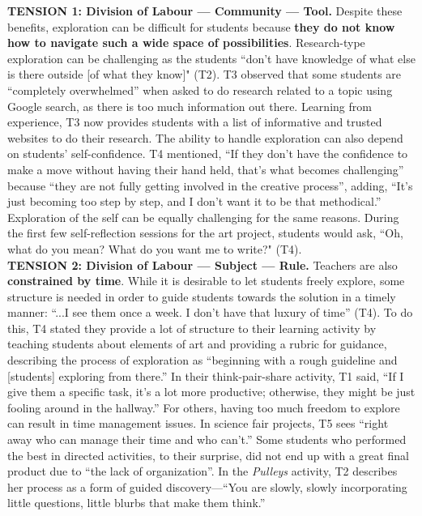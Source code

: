 \textbf{TENSION 1: Division of Labour --- Community --- Tool.} Despite these benefits, exploration can be difficult for students because \textbf{they do not know how to navigate such a wide space of possibilities}. Research-type exploration can be challenging as the students ``don't have knowledge of what else is there outside [of what they know]" (T2). T3 observed that some students are ``completely overwhelmed'' when asked to do research related to a topic using Google search, as there is too much information out there. Learning from experience, T3 now provides students with a list of informative and trusted websites to do their research. The ability to handle exploration can also depend on students' self-confidence.  T4 mentioned, ``If they don't have the confidence to make a move without having their hand held, that's what becomes challenging'' because ``they are not fully getting involved in the creative process'', adding, ``It's just becoming too step by step, and I don't want it to be that methodical.''  Exploration of the self can be equally challenging for the same reasons. During the first few self-reflection sessions for the art project, students would ask, ``Oh, what do you mean?  What do you want me to write?" (T4).\\  


\textbf{TENSION 2: Division of Labour --- Subject --- Rule.} Teachers are also \textbf{constrained by time}. While it is desirable to let students freely explore, some structure is needed in order to guide students towards the solution in a timely manner: ``...I see them once a week.  I don't have that luxury of time'' (T4). To do this, T4 stated they provide a lot of structure to their learning activity by teaching students about elements of art and providing a rubric for guidance, describing the process of exploration as ``beginning with a rough guideline and [students] exploring from there.''  In their think-pair-share activity, T1 said, ``If I give them a specific task, it's a lot more productive; otherwise, they might be just fooling around in the hallway.'' For others, having too much freedom to explore can result in time management issues.  In science fair projects, T5 sees ``right away who can manage their time and who can't.'' Some students who performed the best in directed activities, to their surprise, did not end up with a great final product due to ``the lack of organization''.  In the \textit{Pulleys} activity, T2 describes her process as a form of guided discovery---``You are slowly, slowly incorporating little questions, little blurbs that make them think.''

